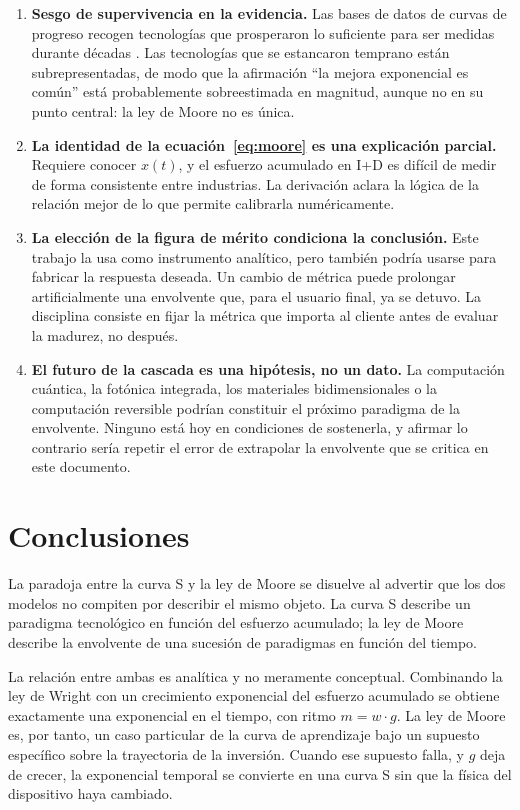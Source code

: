 \documentclass[11pt,letterpaper]{article}
\begin{document}
\begin{enumerate}
  \item \textbf{Sesgo de supervivencia en la evidencia.} Las bases de datos de
    curvas de progreso recogen tecnologías que prosperaron lo suficiente para ser
    medidas durante décadas \parencite{nagy2013,farmer2016}. Las tecnologías que
    se estancaron temprano están subrepresentadas, de modo que la afirmación
    \enquote{la mejora exponencial es común} está probablemente sobreestimada en
    magnitud, aunque no en su punto central: la ley de Moore no es única.
  \item \textbf{La identidad de la ecuación~\eqref{eq:moore} es una explicación
    parcial.} Requiere conocer $x(t)$, y el esfuerzo acumulado en I+D es difícil
    de medir de forma consistente entre industrias. La derivación aclara la
    lógica de la relación mejor de lo que permite calibrarla numéricamente.
  \item \textbf{La elección de la figura de mérito condiciona la conclusión.}
    Este trabajo la usa como instrumento analítico, pero también podría usarse
    para fabricar la respuesta deseada. Un cambio de métrica puede prolongar
    artificialmente una envolvente que, para el usuario final, ya se detuvo. La
    disciplina consiste en fijar la métrica que importa al cliente antes de
    evaluar la madurez, no después.
  \item \textbf{El futuro de la cascada es una hipótesis, no un dato.} La
    computación cuántica, la fotónica integrada, los materiales bidimensionales o
    la computación reversible podrían constituir el próximo paradigma de la
    envolvente. Ninguno está hoy en condiciones de sostenerla, y afirmar lo
    contrario sería repetir el error de extrapolar la envolvente que se critica
    en este documento.
\end{enumerate}

\section*{Conclusiones}

La paradoja entre la curva S y la ley de Moore se disuelve al advertir que los
dos modelos no compiten por describir el mismo objeto. La curva S describe un
paradigma tecnológico en función del esfuerzo acumulado; la ley de Moore describe
la envolvente de una sucesión de paradigmas en función del tiempo.

La relación entre ambas es analítica y no meramente conceptual. Combinando la ley
de Wright con un crecimiento exponencial del esfuerzo acumulado se obtiene
exactamente una exponencial en el tiempo, con ritmo $m = w \cdot g$. La ley de
Moore es, por tanto, un caso particular de la curva de aprendizaje bajo un
supuesto específico sobre la trayectoria de la inversión. Cuando ese supuesto
falla, y $g$ deja de crecer, la exponencial temporal se convierte en una curva S
sin que la física del dispositivo haya cambiado.
\end{document}
